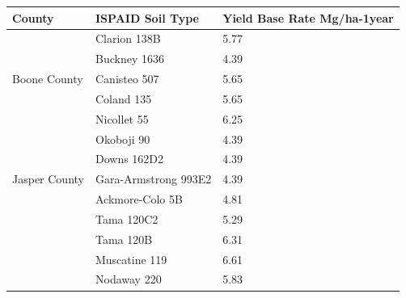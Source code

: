 \documentclass[11pt]{article}
\begin{document}
\begin{itemize}
\begin{table}[H]
\centering
\begin{tabular}{|l|l|l|l|l|l|}
\hline
\multicolumn{2}{|l|}{County}                  & \multicolumn{2}{|l|}{ISPAID Soil Type} & \multicolumn{2}{|l|}{Yield Base Rate Mg/ha-1year} \\ 
\hline
\multicolumn{2}{|l|}{\multirow{5}{*}{Boone County}} & \multicolumn{2}{|l|}{Clarion 138B} & \multicolumn{2}{|l|}{5.77} \\ 
\cline{3-6} 
\multicolumn{2}{|l|}{}                  & \multicolumn{2}{|l|}{Buckney 1636} & \multicolumn{2}{|l|}{4.39} \\ 
\cline{3-6} 
\multicolumn{2}{|l|}{}                  & \multicolumn{2}{|l|}{Canisteo 507} & \multicolumn{2}{|l|}{5.65} \\ 
\cline{3-6} 
\multicolumn{2}{|l|}{}                  & \multicolumn{2}{|l|}{Coland 135} & \multicolumn{2}{|l|}{5.65} \\ 
\cline{3-6} 
\multicolumn{2}{|l|}{}                  & \multicolumn{2}{|l|}{Nicollet 55} & \multicolumn{2}{|l|}{6.25} \\ 
\cline{3-6}
\multicolumn{2}{|l|}{}                  & \multicolumn{2}{|l|}{Okoboji 90} & \multicolumn{2}{|l|}{4.39} \\ 
\hline
\multicolumn{2}{|l|}{\multirow{3}{*}{Jasper County}} & \multicolumn{2}{|l|}{Downs 162D2} & \multicolumn{2}{|l|}{4.39} \\ 
\cline{3-6} 
\multicolumn{2}{|l|}{}                  & \multicolumn{2}{|l|}{Gara-Armstrong 993E2} & \multicolumn{2}{|l|}{4.39} \\ 
\cline{3-6} 
\multicolumn{2}{|l|}{}                  & \multicolumn{2}{|l|}{Ackmore-Colo 5B} & \multicolumn{2}{|l|}{4.81} \\ 
\cline{3-6} 
\multicolumn{2}{|l|}{}                  & \multicolumn{2}{|l|}{Tama 120C2} & \multicolumn{2}{|l|}{5.29} \\ 
\cline{3-6} 
\multicolumn{2}{|l|}{}                  & \multicolumn{2}{|l|}{Tama 120B} & \multicolumn{2}{|l|}{6.31} \\ 
\cline{3-6} 
\multicolumn{2}{|l|}{}                  & \multicolumn{2}{|l|}{Muscatine 119} & \multicolumn{2}{|l|}{6.61} \\ 
\cline{3-6} 
\multicolumn{2}{|l|}{}                  & \multicolumn{2}{|l|}{Nodaway 220} & \multicolumn{2}{|l|}{5.83} \\ 
\hline
\end{tabular}
\end{table}


\end{itemize}
\end{document}
